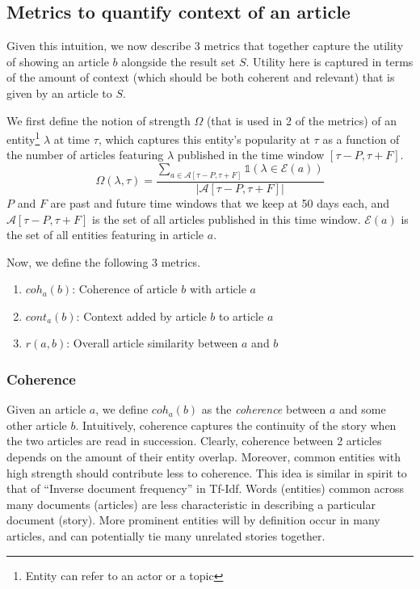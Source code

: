 \subsection{Metrics to quantify context of an article}
\label{sec:finding-context}
Given this intuition, we now describe 3 metrics that together capture the utility of showing an article $b$ alongside the result set $S$. 
Utility here is captured in terms of the amount of context (which should be both coherent and relevant) that is given by an article to $S$. 

We first define the notion of strength $\Omega$ (that is used in 2 of the metrics) of an entity\footnote{Entity can refer to an actor or a topic} $\lambda$ at time $\tau$, which captures this entity's popularity at $\tau$ as a function of the number of articles featuring $\lambda$ published in the time window $[\tau - P, \tau + F]$.
\begin{equation}
\Omega(\lambda, \tau) = \frac{\sum_{a \in \mathcal{A}[\tau - P, \tau + F]}{\mathbb{1}(\lambda \in \mathcal{E}(a))}}{|\mathcal{A}[\tau - P, \tau + F]|}
\end{equation}
$P$ and $F$ are past and future time windows that we keep at 50 days each, and $\mathcal{A}[\tau - P, \tau + F]$ is the set of all articles published in this time window. $\mathcal{E}(a)$ is the set of all entities featuring in article $a$.

Now, we define the following 3 metrics.
\begin{enumerate}
\item $coh_a(b)$: Coherence of article $b$ with article $a$
\item $cont_a(b)$: Context added by article $b$ to article $a$ 
\item $r(a, b)$: Overall article similarity between $a$ and $b$
\end{enumerate}

\subsubsection*{Coherence}
Given an article $a$, we define $coh_{a}(b)$ as the \emph{coherence} between $a$ and some other article $b$. Intuitively, coherence captures the continuity of the story when the two articles are read in succession.
Clearly, coherence between 2 articles depends on the amount of their entity overlap. Moreover, common entities with high strength should contribute less to coherence. This idea is similar in spirit to that of ``Inverse document frequency'' in Tf-Idf. Words (entities) common across many documents (articles) are less characteristic in describing a particular document (story). 
More prominent entities will by definition occur in many articles, and can potentially tie many unrelated stories together. 

